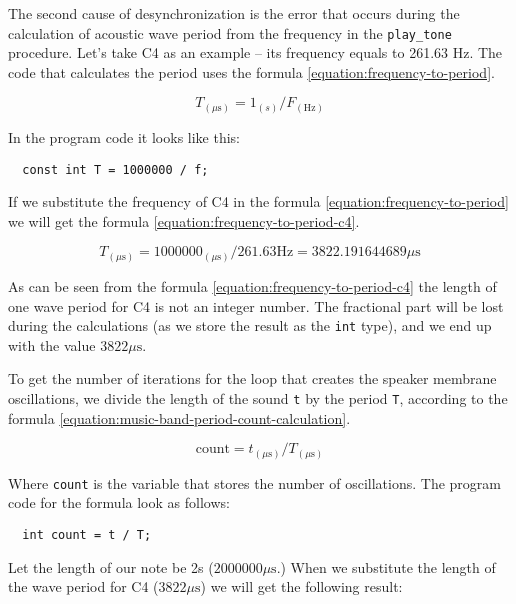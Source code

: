 \documentclass[../sparc.tex]{subfiles}
\begin{document}
The second cause of desynchronization is the error that occurs during the
calculation of acoustic wave period from the frequency in the
\texttt{play\_tone} procedure.  Let's take C4 as an example -- its frequency
equals to 261.63 Hz.  The code that calculates the period uses the formula
\ref{equation:frequency-to-period}.

\begin{equation}
  T_{(\mu\mbox{s})} = 1_{(s)} / F_{(\mbox{Hz})}
  \label{equation:frequency-to-period}
\end{equation}

In the program code it looks like this:

\begin{verbatim}
  const int T = 1000000 / f;
\end{verbatim}

If we substitute the frequency of C4 in the formula
\ref{equation:frequency-to-period} we will get the formula
\ref{equation:frequency-to-period-c4}.

\begin{equation}
  T_{(\mu\mbox{s})} = 1000000_{(\mu\mbox{s})} / 261.63 \mbox{Hz} = 3822.191644689 \mu\mbox{s}
  \label{equation:frequency-to-period-c4}
\end{equation}

As can be seen from the formula \ref{equation:frequency-to-period-c4} the length
of one wave period for C4 is not an integer number.  The fractional part will be
lost during the calculations (as we store the result as the \texttt{int} type),
and we end up with the value $3822 \mu\mbox{s}$.

To get the number of iterations for the loop that creates the speaker membrane
oscillations, we divide the length of the sound \texttt{t} by the period
\texttt{T}, according to the formula
\ref{equation:music-band-period-count-calculation}.

\begin{equation}
  \mbox{count} = t_{(\mu\mbox{s})} / T_{(\mu\mbox{s})}
  \label{equation:music-band-period-count-calculation}
\end{equation}

Where \texttt{count} is the variable that stores the number of oscillations.
The program code for the formula look as follows:

\begin{verbatim}
  int count = t / T;
\end{verbatim}

Let the length of our note be 2s ($2000000 \mu\mbox{s}$.)  When we substitute the
length of the wave period for C4 ($3822 \mu\mbox{s}$) we will get the following
result:
\end{document}
